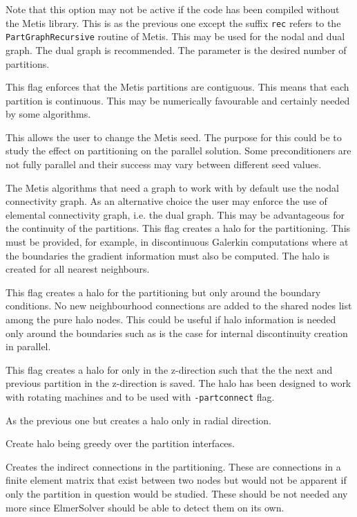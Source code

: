 Note that this option may not be active if the code has been compiled
without the Metis library.
%
This is as the previous one except the suffix \texttt{rec} refers to the \texttt{PartGraphRecursive} routine of Metis. 
This may be used for the nodal and dual graph. The dual graph is recommended. 
The parameter is the desired number of partitions. 

This flag enforces that the Metis partitions are contiguous. This means that
each partition is continuous. This may be numerically favourable and
certainly needed by some algorithms. 

This allows the user to change the Metis seed. The purpose for this could be
to study the effect on partitioning on the parallel solution.
Some preconditioners are not fully parallel and their success may vary between
different seed values. 

The Metis algorithms that need a graph to work with by default use the nodal connectivity graph. As an
alternative choice the user may enforce the use of elemental connectivity graph, i.e. the dual graph. 
This may be advantageous for the continuity of the partitions. 
%
This flag creates a halo for the partitioning. This must be provided, for example, in
discontinuous Galerkin computations where at the boundaries the gradient information 
must also be computed. The halo is created for all nearest neighbours. 

This flag creates a halo for the partitioning but only around the boundary conditions. 
No new neighbourhood connections are added to the shared nodes list among the pure halo nodes. 
This could be useful if halo information is needed only around the boundaries such as is the case 
for internal discontinuity creation in parallel. 

This flag creates a halo for only in the z-direction such that the the next and previous partition in
the z-direction is saved. The halo has been designed to work with rotating machines and to be used with 
\texttt{-partconnect} flag.

As the previous one but creates a halo only in radial direction.

Create halo being greedy over the partition interfaces. 

Creates the indirect connections in the partitioning. These are connections in 
a finite element matrix that exist between two nodes but would not be apparent if
only the partition in question would be studied. These should be not needed any more
since ElmerSolver should be able to detect them on its own. 

